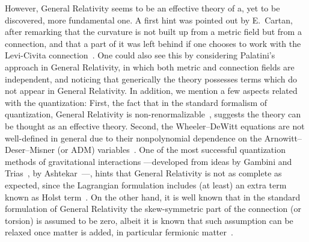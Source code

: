 \documentclass[aps,prd,12pt,twocolumn,superscriptaddress,showpacs,showkeys,reprint%
]{revtex4-1}
\renewcommand{\(}{\left(}
\renewcommand{\)}{\right)}
\renewcommand{\[}{\left[}
\renewcommand{\]}{\right]}
\begin{document}
However, General Relativity seems to be an effective theory of a, yet to be discovered, more fundamental one. A first hint was pointed out by E.~Cartan, after remarking that the curvature is not built up from a metric field but from a connection, and that a part of it was left behind if one chooses to work with the Levi-Civita connection~\cite{Cartan1922,Cartan1923,Cartan1924,Cartan1925}. One could also see this by considering Palatini's approach in General Relativity, in which both metric and connection fields are independent, and noticing that generically the theory possesses terms which do not appear in General Relativity. In addition, we mention a few aspects related with the quantization: First, the fact that in the standard formalism of quantization, General Relativity is non-renormalizable~\cite{'tHooft:1973us,'tHooft:1974bx,Deser:1974cz,Deser:1974cy}, suggests the theory can be thought as an effective theory. Second, the Wheeler--DeWitt equations are not well-defined in general due to their nonpolynomial dependence on the Arnowitt--Deser--Misner (or ADM) variables~\cite{Arnowitt:1959ah,Arnowitt:1960es,WheelerGeo,DeWitt:1967yk,DeWitt:1967ub,DeWitt:1967uc}. One of the most successful quantization methods of gravitational interactions ---developed from ideas by Gambini and Trias~\cite{Gambini:1980yz,Gambini:1986ew}, by Ashtekar~\cite{Ashtekar:1986yd,Ashtekar:1987gu}---, hints that General Relativity is not as complete as expected, since the Lagrangian formulation includes (at least) an extra term known as Holst term~\cite{Holst:1995pc}. On the other hand, it is well known that in the standard formulation of General Relativity the skew-symmetric part of the connection (or torsion) is assumed to be zero, albeit it is known that such assumption can be relaxed once matter is added, in particular fermionic matter~\cite{Kibble:1961ba,Hehl:1976kj,Shapiro:2001rz,Hammond:2002rm}.
\end{document}
